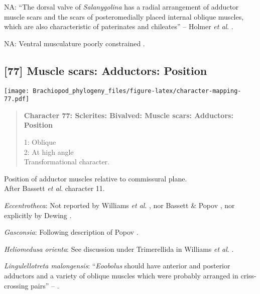 \documentclass[openany]{book}
\theoremstyle{definition}
\theoremstyle{definition}
\theoremstyle{definition}
\theoremstyle{remark}
\begin{document}
\hypertarget{NA-coding-76}{}
NA: ``The dorsal valve of \emph{Salanygolina} has a radial arrangement
of adductor muscle scars and the scars of posteromedially placed
internal oblique muscles, which are also characteristic of paterinates
and chileates'' -- Holmer \emph{et al}.
\citeyearpar{Holmer2009Theenigmatic}.

\hypertarget{NA-coding-76}{}
NA: Ventral musculature poorly constrained
\citep{Williams2000LinguliformeaCraniiformea, Popov2009Earlyontogeny}.

\subsection*{{[}77{]} Muscle scars: Adductors:
Position}\label{muscle-scars-adductors-position}

\texttt{[image: Brachiopod\_phylogeny\_files/figure-latex/character-mapping-77.pdf]}

\begin{quote}
\textbf{Character 77: Sclerites: Bivalved: Muscle scars: Adductors:
Position}

1: Oblique\\
2: At high angle\\
Transformational character.
\end{quote}

Position of adductor muscles relative to commissural plane.\\
After Bassett \emph{et al}.
\citeyearpar{Bassett2001Functionalmorphology} character 11.

\hypertarget{Eccentrotheca-coding-77}{}
\emph{Eccentrotheca}: Not reported by Williams \emph{et al}.
\citeyearpar{Williams2000LinguliformeaCraniiformea}, nor Bassett \&
Popov \citeyearpar{Bassett2017Earliestontogeny}, nor explicitly by
Dewing \citeyearpar{Dewing2001Hingemodifications}.

\hypertarget{Gasconsia-coding-77}{}
\emph{Gasconsia}: Following description of Popov
\citeyearpar{Popov1992TheCambrian}.

\hypertarget{Heliomedusa_orienta-coding-77}{}
\emph{Heliomedusa orienta}: See discussion under Trimerellida in
Williams \emph{et al}.
\citeyearpar{Williams2000LinguliformeaCraniiformea}.

\hypertarget{Lingulellotreta_malongensis-coding-77}{}
\emph{Lingulellotreta malongensis}: ``\emph{Eoobolus} should have
anterior and posterior adductors and a variety of oblique muscles which
were probably arranged in criss-crossing pairs'' --
\citet{Balthasar2009Thebrachiopod}.
\end{document}
